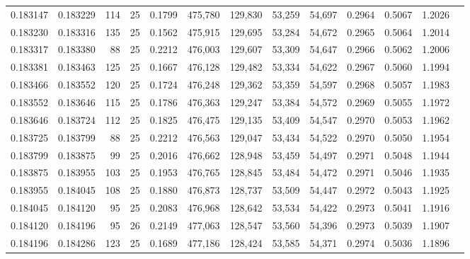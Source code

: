 \begin{tabular}{rrrrrrrrrrrrr}
0.183147 & 0.183229 &   114 &  25 &                                     0.1799 & 475,780 & 129,830 &  53,259 &  54,697 & 0.2964 & 0.5067 & 1.2026 \\
0.183230 & 0.183316 &   135 &  25 &                                     0.1562 & 475,915 & 129,695 &  53,284 &  54,672 & 0.2965 & 0.5064 & 1.2014 \\
0.183317 & 0.183380 &    88 &  25 &                                     0.2212 & 476,003 & 129,607 &  53,309 &  54,647 & 0.2966 & 0.5062 & 1.2006 \\
0.183381 & 0.183463 &   125 &  25 &                                     0.1667 & 476,128 & 129,482 &  53,334 &  54,622 & 0.2967 & 0.5060 & 1.1994 \\
0.183466 & 0.183552 &   120 &  25 &                                     0.1724 & 476,248 & 129,362 &  53,359 &  54,597 & 0.2968 & 0.5057 & 1.1983 \\
0.183552 & 0.183646 &   115 &  25 &                                     0.1786 & 476,363 & 129,247 &  53,384 &  54,572 & 0.2969 & 0.5055 & 1.1972 \\
0.183646 & 0.183724 &   112 &  25 &                                     0.1825 & 476,475 & 129,135 &  53,409 &  54,547 & 0.2970 & 0.5053 & 1.1962 \\
0.183725 & 0.183799 &    88 &  25 &                                     0.2212 & 476,563 & 129,047 &  53,434 &  54,522 & 0.2970 & 0.5050 & 1.1954 \\
0.183799 & 0.183875 &    99 &  25 &                                     0.2016 & 476,662 & 128,948 &  53,459 &  54,497 & 0.2971 & 0.5048 & 1.1944 \\
0.183875 & 0.183955 &   103 &  25 &                                     0.1953 & 476,765 & 128,845 &  53,484 &  54,472 & 0.2971 & 0.5046 & 1.1935 \\
0.183955 & 0.184045 &   108 &  25 &                                     0.1880 & 476,873 & 128,737 &  53,509 &  54,447 & 0.2972 & 0.5043 & 1.1925 \\
0.184045 & 0.184120 &    95 &  25 &                                     0.2083 & 476,968 & 128,642 &  53,534 &  54,422 & 0.2973 & 0.5041 & 1.1916 \\
0.184120 & 0.184196 &    95 &  26 &                                     0.2149 & 477,063 & 128,547 &  53,560 &  54,396 & 0.2973 & 0.5039 & 1.1907 \\
0.184196 & 0.184286 &   123 &  25 &                                     0.1689 & 477,186 & 128,424 &  53,585 &  54,371 & 0.2974 & 0.5036 & 1.1896 \\

\end{tabular}
